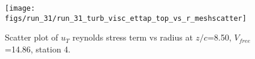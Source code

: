 \begin{figure}[H]
\centering
\texttt{[image: figs/run\_31/run\_31\_turb\_visc\_ettap\_top\_vs\_r\_meshscatter]}
\caption{Scatter plot of $
u_T$ reynolds stress term vs radius at $z/c$=8.50, $V_{free}$=14.86, station 4.}
\label{fig:run_31_turb_visc_ettap_top_vs_r_meshscatter}
\end{figure}


